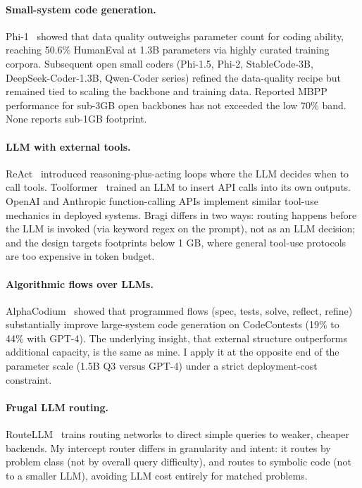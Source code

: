 \documentclass[11pt,a4paper]{article}
\begin{document}
\paragraph{Small-system code generation.}
Phi-1~\cite{phi1} showed that data quality outweighs parameter count for coding ability, reaching 50.6\% HumanEval at 1.3B parameters via highly curated training corpora. Subsequent open small coders (Phi-1.5, Phi-2, StableCode-3B, DeepSeek-Coder-1.3B, Qwen-Coder series) refined the data-quality recipe but remained tied to scaling the backbone and training data. Reported MBPP performance for sub-3GB open backbones has not exceeded the low 70\% band. None reports sub-1GB footprint.

\paragraph{LLM with external tools.}
ReAct~\cite{react} introduced reasoning-plus-acting loops where the LLM decides when to call tools. Toolformer~\cite{toolformer} trained an LLM to insert API calls into its own outputs. OpenAI and Anthropic function-calling APIs implement similar tool-use mechanics in deployed systems. Bragi differs in two ways: routing happens before the LLM is invoked (via keyword regex on the prompt), not as an LLM decision; and the design targets footprints below 1 GB, where general tool-use protocols are too expensive in token budget.

\paragraph{Algorithmic flows over LLMs.}
AlphaCodium~\cite{alphacodium} showed that programmed flows (spec, tests, solve, reflect, refine) substantially improve large-system code generation on CodeContests (19\% to 44\% with GPT-4). The underlying insight, that external structure outperforms additional capacity, is the same as mine. I apply it at the opposite end of the parameter scale (1.5B Q3 versus GPT-4) under a strict deployment-cost constraint.

\paragraph{Frugal LLM routing.}
RouteLLM~\cite{routellm} trains routing networks to direct simple queries to weaker, cheaper backends. My intercept router differs in granularity and intent: it routes by problem class (not by overall query difficulty), and routes to symbolic code (not to a smaller LLM), avoiding LLM cost entirely for matched problems.
\end{document}
